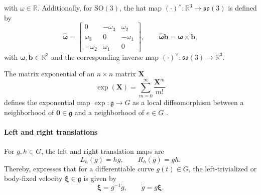 with $\omega \in \mathbb{R}$.
Additionally, for \(\mathrm{SO}(3)\), the hat map \((\cdot)^{\wedge}:\mathbb{R}^{3}\rightarrow\mathfrak{so}(3)\) is defined by
\begin{equation}
    \widehat{\bm{\omega}}
    =
    \begin{bmatrix}
        0 & -\omega_{3} & \omega_{2}\\
        \omega_{3} & 0 & -\omega_{1}\\
        -\omega_{2} & \omega_{1} & 0
    \end{bmatrix},
    \qquad
    \widehat{\bm{\omega}}\bm{b}=\bm{\omega}\times\bm{b},
    \label{eq:hat_map_so3}
\end{equation}
with $\bm{\omega}, \bm{b} \in \mathbb{R}^3$ and the corresponding inverse map \((\cdot)^{\vee}: \mathfrak{so}(3) \rightarrow \mathbb{R}^3\).

The matrix exponential of an $n\times n$ matrix $\bm{X}$
\begin{equation}
    \exp(\bm{X})=\sum_{m=0}^{\infty} \frac{\bm{X}^m}{m!}
    \label{eq:matrix_exponential}
\end{equation}
defines the exponential map \(\exp:\mathfrak{g}\rightarrow G\) as a local diffeomorphism between a neighborhood of \(\bm{0}\in\mathfrak{g}\) and a neighborhood of \(e\in G\) \cite{Hall2000LieGroups,Lee2008}.

\paragraph{Left and right translations}
For \(g,h\in G\), the left and right translation maps are
\begin{equation}
    L_{h}(g)=hg,
    \qquad
    R_{h}(g)=gh.
    \label{eq:left_right_translation}
\end{equation}
Thereby, \cite{Lee2008} expresses that for a differentiable curve $g(t) \in G$, the left-trivialized or body-fixed velocity $\bm{\xi} \in \mathfrak{g}$ is given by
\begin{equation}
    \bm{\xi}=g^{-1}\dot{g},
    \qquad
    \dot{g}=g\bm{\xi}.
    \label{eq:left_trivialized_velocity}
\end{equation}

